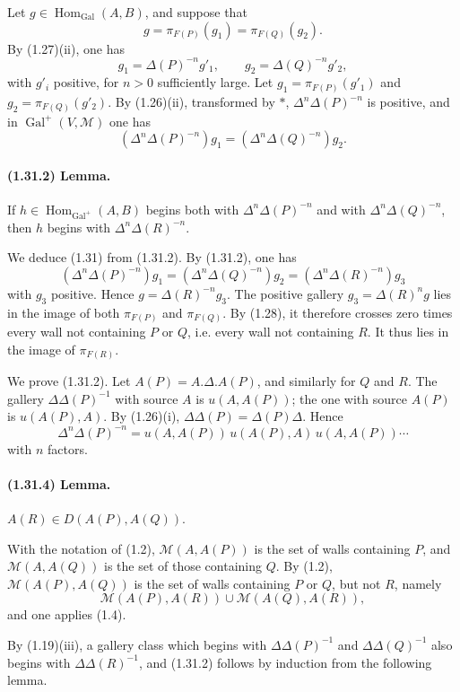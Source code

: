 \documentclass[10pt]{article}
\begin{document}
Let \(g\in\operatorname{Hom}_{\operatorname{Gal}}(A,B)\), and suppose that
\[
g=\pi_{F(P)}(g_1)=\pi_{F(Q)}(g_2).
\]
By (1.27)(ii), one has
\[
g_1=\Delta(P)^{-n}g'_1,\qquad
g_2=\Delta(Q)^{-n}g'_2,
\]
with \(g'_i\) positive, for \(n>0\) sufficiently large. Let \(g_1=\pi_{F(P)}(g'_1)\) and \(g_2=\pi_{F(Q)}(g'_2)\). By (1.26)(ii), transformed by \(*\), \(\Delta^n\Delta(P)^{-n}\) is positive, and in \(\operatorname{Gal}^+(V,\mathcal M)\) one has
\[
\tag{1.31.1}
(\Delta^n\Delta(P)^{-n})g_1=(\Delta^n\Delta(Q)^{-n})g_2.
\]

\paragraph{(1.31.2) Lemma.} If \(h\in\operatorname{Hom}_{\operatorname{Gal}^+}(A,B)\) begins both with \(\Delta^n\Delta(P)^{-n}\) and with \(\Delta^n\Delta(Q)^{-n}\), then \(h\) begins with \(\Delta^n\Delta(R)^{-n}\).

We deduce (1.31) from (1.31.2). By (1.31.2), one has
\[
(\Delta^n\Delta(P)^{-n})g_1=(\Delta^n\Delta(Q)^{-n})g_2=(\Delta^n\Delta(R)^{-n})g_3
\]
with \(g_3\) positive. Hence \(g=\Delta(R)^{-n}g_3\). The positive gallery \(g_3=\Delta(R)^n g\) lies in the image of both \(\pi_{F(P)}\) and \(\pi_{F(Q)}\). By (1.28), it therefore crosses zero times every wall not containing \(P\) or \(Q\), i.e. every wall not containing \(R\). It thus lies in the image of \(\pi_{F(R)}\).

We prove (1.31.2). Let \(A(P)=A.\Delta.A(P)\), and similarly for \(Q\) and \(R\). The gallery \(\Delta\Delta(P)^{-1}\) with source \(A\) is \(u(A,A(P))\); the one with source \(A(P)\) is \(u(A(P),A)\). By (1.26)(i), \(\Delta\Delta(P)=\Delta(P)\Delta\). Hence
\[
\tag{1.31.3}
\Delta^n\Delta(P)^{-n}=u(A,A(P))\,u(A(P),A)\,u(A,A(P))\cdots
\]
with \(n\) factors.

\paragraph{(1.31.4) Lemma.} \(A(R)\in D(A(P),A(Q))\).

With the notation of (1.2), \(\mathcal M(A,A(P))\) is the set of walls containing \(P\), and \(\mathcal M(A,A(Q))\) is the set of those containing \(Q\). By (1.2), \(\mathcal M(A(P),A(Q))\) is the set of walls containing \(P\) or \(Q\), but not \(R\), namely
\[
\mathcal M(A(P),A(R))\cup \mathcal M(A(Q),A(R)),
\]
and one applies (1.4).

By (1.19)(iii), a gallery class which begins with \(\Delta\Delta(P)^{-1}\) and \(\Delta\Delta(Q)^{-1}\) also begins with \(\Delta\Delta(R)^{-1}\), and (1.31.2) follows by induction from the following lemma.
\end{document}
